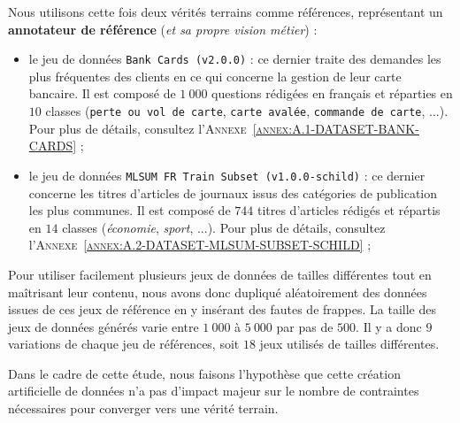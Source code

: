 			Nous utilisons cette fois deux vérités terrains comme références, représentant un \textbf{annotateur de référence} (\textit{et sa propre vision métier}) :
			\begin{itemize}
				\item le jeu de données \texttt{Bank Cards (v2.0.0)} : ce dernier traite des demandes les plus fréquentes des clients en ce qui concerne la gestion de leur carte bancaire.
				Il est composé de $1~000$ questions rédigées en français et réparties en $10$ classes (\texttt{perte ou vol de carte}, \texttt{carte avalée}, \texttt{commande de carte}, ...).
				Pour plus de détails, consultez l'\textsc{Annexe~\ref{annex:A.1-DATASET-BANK-CARDS}} ;
				\item le jeu de données \texttt{MLSUM FR Train Subset (v1.0.0-schild)} : ce dernier concerne les titres d'articles de journaux issus des catégories de publication les plus communes.
				Il est composé de $744$  titres d'articles rédigés et répartis en $14$ classes (\textit{économie}, \textit{sport}, ...).
				Pour plus de détails, consultez l'\textsc{Annexe~\ref{annex:A.2-DATASET-MLSUM-SUBSET-SCHILD}} ;
			\end{itemize}
			
			Pour utiliser facilement plusieurs jeux de données de tailles différentes tout en maîtrisant leur contenu, nous avons donc dupliqué aléatoirement des données issues de ces jeux de référence en y insérant des fautes de frappes.
			La taille des jeux de données générés varie entre $1~000$ à $5~000$ par pas de $500$.
			Il y a donc $9$ variations de chaque jeu de références, soit $18$ jeux utilisés de tailles différentes.
			
			\begin{leftBarWarning}
				Dans le cadre de cette étude, nous faisons l'hypothèse que cette création artificielle de données n'a pas d'impact majeur sur le nombre de contraintes nécessaires pour converger vers une vérité terrain.
			\end{leftBarWarning}
			

